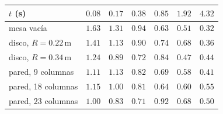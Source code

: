 \begin{tabular}{lcccccc}
  \hline
  $t$ (s) & $0.08$ & $0.17$ & $0.38$ & $0.85$ & $1.92$ & $4.32$ \\
  \hline
  mesa vacía & $1.63$ & $1.31$ & $0.94$ & $0.63$ & $0.51$ & $0.32$ \\
  disco, $R = 0.22\,\mathrm{m}$ & $1.41$ & $1.13$ & $0.90$ & $0.74$ & $0.68$ & $0.36$ \\
  disco, $R = 0.34\,\mathrm{m}$ & $1.24$ & $0.89$ & $0.72$ & $0.84$ & $0.47$ & $0.44$ \\
  pared, 9 columnas & $1.11$ & $1.13$ & $0.82$ & $0.69$ & $0.58$ & $0.41$ \\
  pared, 18 columnas & $1.15$ & $1.00$ & $0.81$ & $0.64$ & $0.60$ & $0.55$ \\
  pared, 23 columnas & $1.00$ & $0.83$ & $0.71$ & $0.92$ & $0.68$ & $0.50$ \\
  \hline
\end{tabular}
